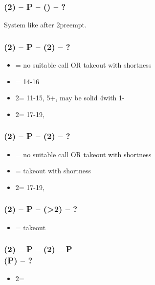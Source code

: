 \documentclass[12pt, a4paper]{report}
\begin{document}
        \subsubsection*{(2\diams) -- P -- () -- ?}
        System like after 2\diams preempt.

        \subsubsection*{(2\diams) -- P -- (2\hearts) -- ?}
        \begin{itemize}
            \item \pass = no suitable call OR takeout with \spades shortness
            \item \dbl = 14-16 \bal \vimp
            \item 2\spades = 11-15, 5+\spades, may be solid 4\spades with 1-\hearts
            \item 2\nt = 17-19, \bal
        \end{itemize}

        \subsubsection*{(2\diams) -- P -- (2\spades) -- ?}
        \begin{itemize}
            \item \pass = no suitable call OR takeout with \hearts shortness \imp
            \item \dbl = takeout with \spades shortness \imp
            \item 2\nt = 17-19, \bal
        \end{itemize}

        \subsubsection*{(2\diams) -- P -- (>2\spades) -- ?}
        \begin{itemize}
            \item \dbl = takeout \imp
        \end{itemize}

        \subsubsection*{(2\diams) -- P -- (2\hearts) -- P \\
                        (P) -- ?}        
        \begin{itemize}
            \item 2\nt = \minor
        \end{itemize}
\end{document}
